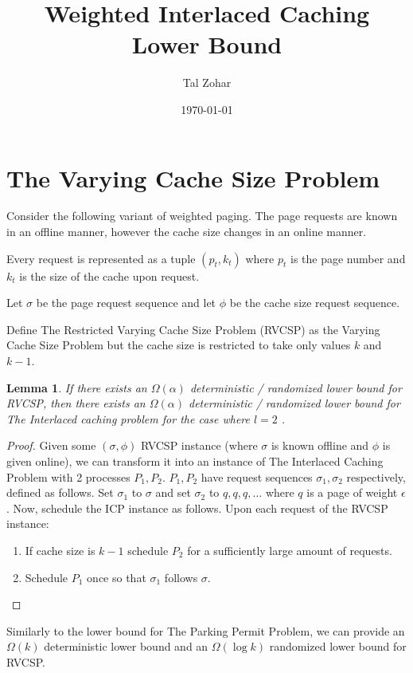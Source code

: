 \documentclass[12pt]{article}
\title{Weighted Interlaced Caching Lower Bound}
\author{Tal Zohar}
\date{\today}
\newtheorem{lemma}{Lemma}      %
\begin{document}
\maketitle

\section{The Varying Cache Size Problem}
Consider the following variant of weighted paging. 
The page requests are known in an offline manner, however the cache size changes in an online manner.

Every request is represented as a tuple $(p_t, k_t)$ where $p_t$ is the page number and $k_t$ is the size of the cache upon request.

Let $\sigma$ be the page request sequence and let $\phi$ be the cache size request sequence.

Define The Restricted Varying Cache Size Problem (RVCSP) as the Varying Cache Size Problem but the cache size is restricted to take only values $k$ and $k-1$.

\begin{lemma}
  If there exists an $\Omega(\alpha)$ deterministic / randomized lower bound for RVCSP, then there exists an $\Omega(\alpha)$ deterministic / randomized lower bound for The Interlaced caching problem for the case where $l=2$ .
\end{lemma}
\begin{proof}
  Given some $(\sigma, \phi)$ RVCSP instance (where $\sigma$ is known offline and $\phi$ is given online), we can transform it into an instance of The Interlaced Caching Problem with 2 processes $P_1,P_2$.
  $P_1,P_2$ have request sequences $\sigma_1,\sigma_2$ respectively, defined as follows.
  Set $\sigma_1$ to $\sigma$ and set $\sigma_2$ to $q,q,q,\ldots$ where $q$ is a page of weight $\epsilon$. 
  Now, schedule the ICP instance as follows. Upon each request of the RVCSP instance:
  \begin{enumerate}
    \item If cache size is $k-1$ schedule $P_2$ for a sufficiently large amount of requests. 
    \item Schedule $P_1$ once so that $\sigma_1$ follows $\sigma$.    
  \end{enumerate}
\end{proof}

Similarly to the lower bound for The Parking Permit Problem, we can provide an $\Omega(k)$ deterministic lower bound and an $\Omega\left( \log k \right) $ randomized lower bound for RVCSP.
\end{document}
